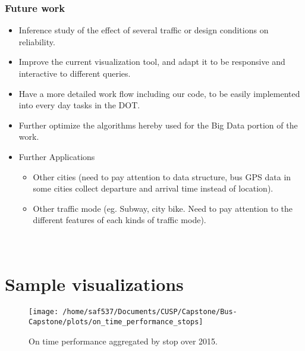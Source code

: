 \documentclass[12pt]{report}
\begin{document}
\subsubsection*{Future work}

\begin{itemize}
\item Inference study of the effect of several traffic or design conditions on reliability.
\item Improve the current visualization tool, and adapt it to be responsive and interactive to different queries.
\item Have a more detailed work flow including our code, to be easily implemented into every day tasks in the DOT.
\item Further optimize the algorithms hereby used for the Big Data portion of the work.
\item Further Applications
\begin{itemize}
\item Other cities (need to pay attention to data structure, bus GPS data in some cities collect departure and arrival time instead of location).
\item Other traffic mode (eg. Subway, city bike. Need to pay attention to the different features of each kinds of traffic mode).
\end{itemize}
\end{itemize}



\newpage
\appendix
\section{\\Sample visualizations} \label{App:AppendixA}


\begin{figure}[!ht]
  \caption{On time performance aggregated by stop over 2015.}
  \centering
    \texttt{[image: /home/saf537/Documents/CUSP/Capstone/Bus-Capstone/plots/on\_time\_performance\_stops]}
\end{figure}
\end{document}
